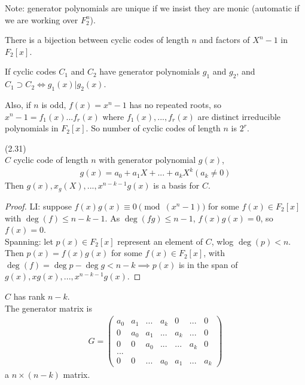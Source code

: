 \documentclass[a4paper]{article}
\begin{document}
Note: generator polynomials are unique if we insist they are monic (automatic if we are working over $F_2^n$).

\begin{coro}
There is a bijection between cyclic codes of length $n$ and factors of $X^n-1$ in $F_2[x]$.
\end{coro}

If cyclic codes $C_1$ and $C_2$ have generator polynomials $g_1$ and $g_2$, and $C_1 \supset C_2 \iff g_1(x) | g_2(x)$.

Also, if $n$ is odd, $f(x) = x^n-1$ has no repeated roots, so $x^n-1 = f_1(x) ... f_r(x)$ where $f_1(x),...,f_r(x)$ are distinct irreducible polynomials in $F_2[x]$. So number of cyclic codes of length $n$ is $2^r$.

\begin{lemma} (2.31)\\
$C$ cyclic code of length $n$ with generator polynomial $g(x)$,
\begin{equation*}
\begin{aligned}
g(x) = a_0 + a_1 X + ... + a_k X^k (a_k \neq 0)
\end{aligned}
\end{equation*}
Then $g(x), x_g(X),...,x^{n-k-1} g(x)$ is a basis for $C$.
\begin{proof}
LI: suppose $f(x) g(x) \equiv 0 \pmod (x^n-1)$ for some $f(x) \in F_2[x]$ with $\deg(f) \leq n-k-1$. As $\deg (fg) \leq n-1$, $f(x)g(x) = 0$, so $f(x) = 0$.\\
Spanning: let $p(x) \in F_2[x]$ represent an element of $C$, wlog $\deg(p)< n$. Then $p(x) = f(x)g(x)$ for some $f(x) \in F_2[x]$, with $\deg (f) = \deg p - \deg g < n-k \implies p(x)$ is in the span of $g(x),xg(x),...,x^{n-k-1}g(x)$.
\end{proof}
\end{lemma}

\begin{coro}
$C$ has rank $n-k$.\\
The generator matrix is 
\begin{equation*}
\begin{aligned}
G = \begin{pmatrix}
a_0 & a_1 & ... & a_k & 0 & ... & 0\\
0 & a_0 & a_1 & ... & a_k & ... & 0\\
0 & 0 & a_0 & ... & ... & a_k & 0\\
...\\
0 & 0 & ... & a_0 & a_1 & ... & a_k
\end{pmatrix}
\end{aligned}
\end{equation*}
a $n \times (n-k)$ matrix.
\end{coro}
\end{document}
